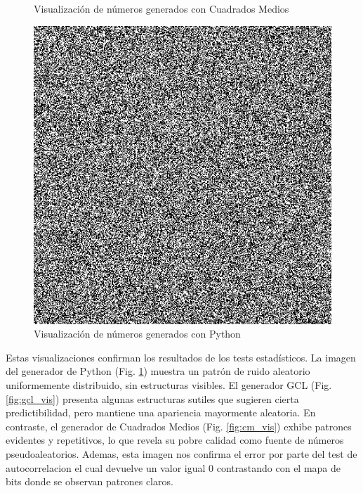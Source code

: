 \documentclass{article}
\begin{document}
\begin{figure}[H]
\begin{minipage}[t]{0.31\textwidth}
        \caption{Visualización de números generados con Cuadrados Medios}
        \label{fig:cm_vis}
    \end{minipage}
    \hfill
    \begin{minipage}[t]{0.31\textwidth}
        \centering
        \includegraphics[width=\textwidth]{visualizaciones_prueba/Python_bitmap.png}
        \caption{Visualización de números generados con Python}
        \label{fig:python_vis}
    \end{minipage}
\end{figure}
Estas visualizaciones confirman los resultados de los tests estadísticos. La imagen del generador de Python (Fig. \ref{fig:python_vis}) muestra un patrón de ruido aleatorio uniformemente distribuido, sin estructuras visibles. El generador GCL (Fig. \ref{fig:gcl_vis}) presenta algunas estructuras sutiles que sugieren cierta predictibilidad, pero mantiene una apariencia mayormente aleatoria. En contraste, el generador de Cuadrados Medios (Fig. \ref{fig:cm_vis}) exhibe patrones evidentes y repetitivos, lo que revela su pobre calidad como fuente de números pseudoaleatorios. Ademas, esta imagen nos confirma el error por parte del test de autocorrelacion el cual devuelve un valor igual 0 contrastando con el mapa de bits donde se observan patrones claros.
\end{document}
